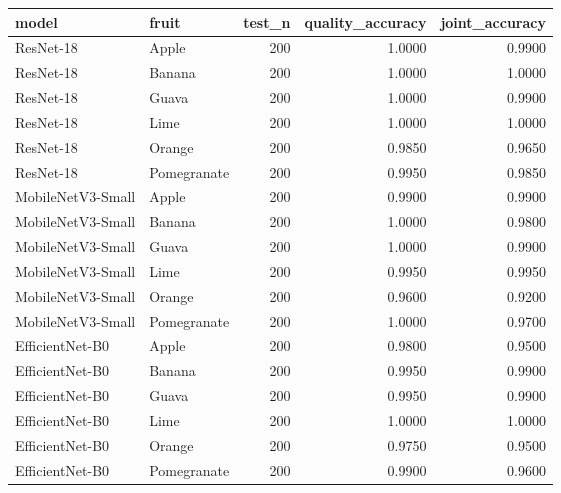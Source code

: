 \begin{tabular}{llrrr}
\toprule
model & fruit & test_n & quality_accuracy & joint_accuracy \\
\midrule
ResNet-18 & Apple & 200 & 1.0000 & 0.9900 \\
ResNet-18 & Banana & 200 & 1.0000 & 1.0000 \\
ResNet-18 & Guava & 200 & 1.0000 & 0.9900 \\
ResNet-18 & Lime & 200 & 1.0000 & 1.0000 \\
ResNet-18 & Orange & 200 & 0.9850 & 0.9650 \\
ResNet-18 & Pomegranate & 200 & 0.9950 & 0.9850 \\
MobileNetV3-Small & Apple & 200 & 0.9900 & 0.9900 \\
MobileNetV3-Small & Banana & 200 & 1.0000 & 0.9800 \\
MobileNetV3-Small & Guava & 200 & 1.0000 & 0.9900 \\
MobileNetV3-Small & Lime & 200 & 0.9950 & 0.9950 \\
MobileNetV3-Small & Orange & 200 & 0.9600 & 0.9200 \\
MobileNetV3-Small & Pomegranate & 200 & 1.0000 & 0.9700 \\
EfficientNet-B0 & Apple & 200 & 0.9800 & 0.9500 \\
EfficientNet-B0 & Banana & 200 & 0.9950 & 0.9900 \\
EfficientNet-B0 & Guava & 200 & 0.9950 & 0.9900 \\
EfficientNet-B0 & Lime & 200 & 1.0000 & 1.0000 \\
EfficientNet-B0 & Orange & 200 & 0.9750 & 0.9500 \\
EfficientNet-B0 & Pomegranate & 200 & 0.9900 & 0.9600 \\
\bottomrule
\end{tabular}
